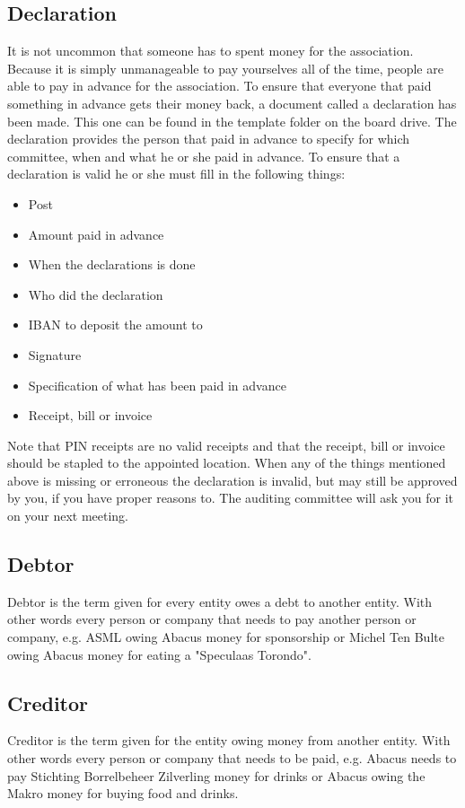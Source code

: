 \documentclass{report}
\begin{document}
\subsection{Declaration}
It is not uncommon that someone has to spent money for the association. Because it is simply unmanageable to pay yourselves all of the time, people are able to pay in advance for the association. To ensure that everyone that paid something in advance gets their money back, a document called a declaration has been made. This one can be found in the template folder on the board drive. The declaration provides the person that paid in advance to specify for which committee, when and what he or she paid in advance. To ensure that a declaration is valid he or she must fill in the following things:
\begin{itemize}
\item Post
\item Amount paid in advance
\item When the declarations is done
\item Who did the declaration
\item IBAN to deposit the amount to
\item Signature
\item Specification of what has been paid in advance
\item Receipt, bill or invoice
\end{itemize}
Note that PIN receipts are no valid receipts and that the receipt, bill or invoice should be stapled to the appointed location. When any of the things mentioned above is missing or erroneous the declaration is invalid, but may still be approved by you, if you have proper reasons to. The auditing committee will ask you for it on your next meeting.  
   
\subsection{Debtor}
Debtor is the term given for every entity owes a debt to another entity. With other words every person or company that needs to pay another person or company, e.g. ASML owing Abacus money for sponsorship or Michel Ten Bulte owing Abacus money for eating a "Speculaas Torondo". 
\subsection{Creditor}
Creditor is the term given for the entity owing money from another entity. With other words every person or company that needs to be paid, e.g. Abacus needs to pay Stichting Borrelbeheer Zilverling money for drinks or Abacus owing the Makro money for buying food and drinks. 
\end{document}
